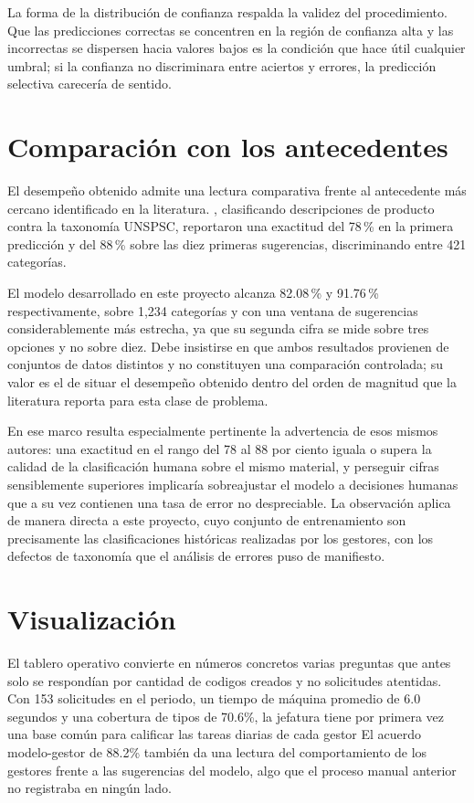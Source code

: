 La forma de la distribución de confianza respalda la validez del procedimiento. Que las predicciones correctas se concentren en la región de confianza alta y las incorrectas se dispersen hacia valores bajos es la condición que hace útil cualquier umbral; si la confianza no discriminara entre aciertos y errores, la predicción selectiva carecería de sentido.

\section{Comparación con los antecedentes}
El desempeño obtenido admite una lectura comparativa frente al antecedente más cercano identificado en la literatura. , clasificando descripciones de producto contra la taxonomía UNSPSC, reportaron una exactitud del 78\,\% en la primera predicción y del 88\,\% sobre las diez primeras sugerencias, discriminando entre 421 categorías.

El modelo desarrollado en este proyecto alcanza 82.08\,\% y 91.76\,\% respectivamente, sobre 1,234 categorías y con una ventana de sugerencias considerablemente más estrecha, ya que su segunda cifra se mide sobre tres opciones y no sobre diez. Debe insistirse en que ambos resultados provienen de conjuntos de datos distintos y no constituyen una comparación controlada; su valor es el de situar el desempeño obtenido dentro del orden de magnitud que la literatura reporta para esta clase de problema.

En ese marco resulta especialmente pertinente la advertencia de esos mismos autores: una exactitud en el rango del 78 al 88 por ciento iguala o supera la calidad de la clasificación humana sobre el mismo material, y perseguir cifras sensiblemente superiores implicaría sobreajustar el modelo a decisiones humanas que a su vez contienen una tasa de error no despreciable. La observación aplica de manera directa a este proyecto, cuyo conjunto de entrenamiento son precisamente las clasificaciones históricas realizadas por los gestores, con los defectos de taxonomía que el análisis de errores puso de manifiesto.


\section{Visualización}

El tablero operativo convierte en números concretos varias preguntas que antes solo se respondían por cantidad de codigos creados y no solicitudes atentidas. Con 153 solicitudes en el periodo, un tiempo de máquina promedio de 6.0 segundos y una cobertura de tipos de 70.6\%, la jefatura tiene por primera vez una base común para calificar las tareas diarias de cada gestor El acuerdo modelo-gestor de 88.2\% también da una lectura del comportamiento de los gestores frente a las sugerencias del modelo, algo que el proceso manual anterior no registraba en ningún lado.

